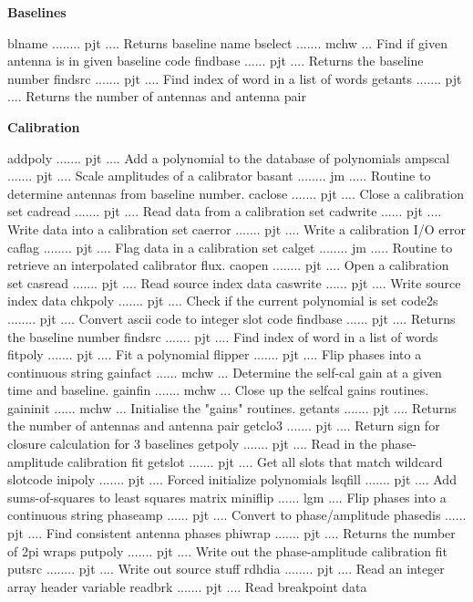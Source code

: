 \par\centerline{\bf Baselines}
{\eightpoint\begintt
blname ........ pjt .... Returns baseline name
bselect ....... mchw ... Find if given antenna is in given baseline code
findbase ...... pjt .... Returns the baseline number
findsrc ....... pjt .... Find index of word in a list of words
getants ....... pjt .... Returns the number of antennas and antenna pair
\endtt}
\par\centerline{\bf Calibration}
{\eightpoint\begintt
addpoly ....... pjt .... Add a polynomial to the database of polynomials
ampscal ....... pjt .... Scale amplitudes of a calibrator
basant ........ jm ..... Routine to determine antennas from baseline number.
caclose ....... pjt .... Close a calibration set
cadread ....... pjt .... Read data from a calibration set
\endtt}
{\eightpoint\begintt
cadwrite ...... pjt .... Write data into a calibration set
caerror ....... pjt .... Write a calibration I/O error
caflag ........ pjt .... Flag data in a calibration set
calget ........ jm ..... Routine to retrieve an interpolated calibrator flux.
caopen ........ pjt .... Open a calibration set
\endtt}
{\eightpoint\begintt
casread ....... pjt .... Read source index data
caswrite ...... pjt .... Write source index data
chkpoly ....... pjt .... Check if the current polynomial is set
code2s ........ pjt .... Convert ascii code to integer slot code
findbase ...... pjt .... Returns the baseline number
\endtt}
{\eightpoint\begintt
findsrc ....... pjt .... Find index of word in a list of words
fitpoly ....... pjt .... Fit a polynomial
flipper ....... pjt .... Flip phases into a continuous string
gainfact ...... mchw ... Determine the self-cal gain at a given time and baseline.
gainfin ....... mchw ... Close up the selfcal gains routines.
\endtt}
{\eightpoint\begintt
gaininit ...... mchw ... Initialise the "gains" routines.
getants ....... pjt .... Returns the number of antennas and antenna pair
getclo3 ....... pjt .... Return sign for closure calculation for 3 baselines
getpoly ....... pjt .... Read in the phase-amplitude calibration fit
getslot ....... pjt .... Get all slots that match wildcard slotcode
\endtt}
{\eightpoint\begintt
inipoly ....... pjt .... Forced initialize polynomials
lsqfill ....... pjt .... Add sums-of-squares to least squares matrix
miniflip ...... lgm .... Flip phases into a continuous string
phaseamp ...... pjt .... Convert to phase/amplitude
phasedis ...... pjt .... Find consistent antenna phases
\endtt}
{\eightpoint\begintt
phiwrap ....... pjt .... Returns the number of 2pi wraps
putpoly ....... pjt .... Write out the phase-amplitude calibration fit
putsrc ........ pjt .... Write out source stuff
rdhdia ........ pjt .... Read an integer array header variable
readbrk ....... pjt .... Read breakpoint data
\endtt}
